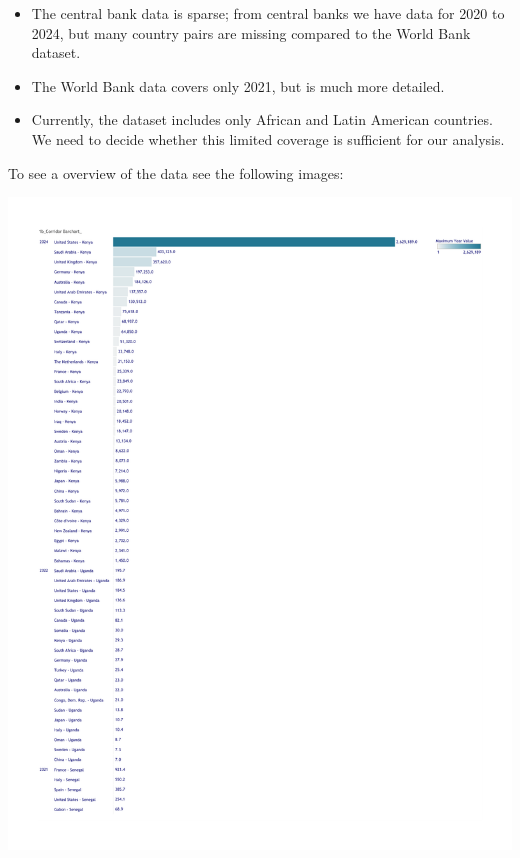 \documentclass[
  11pt,
]{article}
\providecommand{\tightlist}{%
  \setlength{\itemsep}{0pt}\setlength{\parskip}{0pt}}\usepackage{longtable,booktabs,array}
\begin{document}
\begin{itemize}
\tightlist
\item
  The central bank data is sparse; from central banks we have data for
  2020 to 2024, but many country pairs are missing compared to the World
  Bank dataset.
\item
  The World Bank data covers only 2021, but is much more detailed.
\item
  Currently, the dataset includes only African and Latin American
  countries. We need to decide whether this limited coverage is
  sufficient for our analysis.
\end{itemize}

To see a overview of the data see the following images:

\includegraphics{data/Remittance_3/remitscope_africa_page_30.png}
\end{document}
